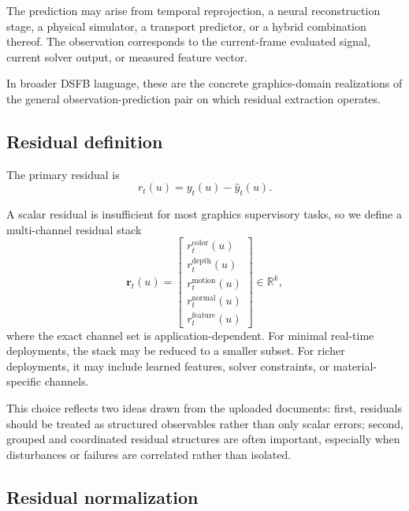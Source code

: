 \documentclass[11pt]{article}
\theoremstyle{definition}
\theoremstyle{plain}
\begin{document}
The prediction may arise from temporal reprojection, a neural reconstruction stage, a physical simulator, a transport predictor, or a hybrid combination thereof. The observation corresponds to the current-frame evaluated signal, current solver output, or measured feature vector.

In broader DSFB language, these are the concrete graphics-domain realizations of the general observation-prediction pair on which residual extraction operates. 


\subsection{Residual definition}

The primary residual is
\begin{equation}
r_t(u)=y_t(u)-\hat y_t(u).
\end{equation}

A scalar residual is insufficient for most graphics supervisory tasks, so we define a multi-channel residual stack
\begin{equation}
\mathbf r_t(u)=
\begin{bmatrix}
r_t^{\mathrm{color}}(u)\\
r_t^{\mathrm{depth}}(u)\\
r_t^{\mathrm{motion}}(u)\\
r_t^{\mathrm{normal}}(u)\\
r_t^{\mathrm{feature}}(u)
\end{bmatrix}
\in \mathbb{R}^k,
\end{equation}
where the exact channel set is application-dependent. For minimal real-time deployments, the stack may be reduced to a smaller subset. For richer deployments, it may include learned features, solver constraints, or material-specific channels.

This choice reflects two ideas drawn from the uploaded documents: first, residuals should be treated as structured observables rather than only scalar errors; second, grouped and coordinated residual structures are often important, especially when disturbances or failures are correlated rather than isolated. 


\subsection{Residual normalization}
\end{document}
